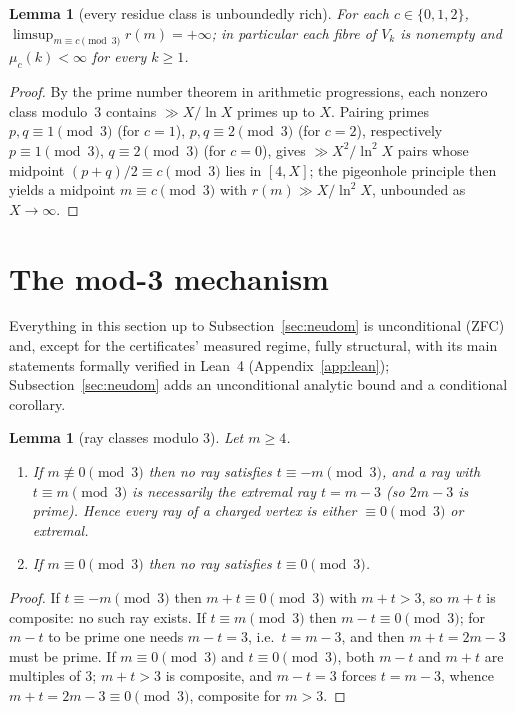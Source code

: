 \documentclass[11pt]{article}
\theoremstyle{plain}
\newtheorem{lemma}[theorem]{Lemma}
\theoremstyle{definition}
\newcommand{\rch}{r}
\newcommand{\Vk}{V_{k}}
\begin{document}
\begin{lemma}[every residue class is unboundedly rich]
\label{lem:fibres}
For each $c \in \{0,1,2\}$,
$\limsup_{m \equiv c \pmod 3} \rch(m) = +\infty$; in particular each
fibre of $\Vk$ is nonempty and $\mu_c(k) < \infty$ for every $k \ge 1$.
\end{lemma}

\begin{proof}
By the prime number theorem in arithmetic progressions, each
nonzero class modulo~$3$ contains $\gg X/\ln X$ primes up to $X$.
Pairing primes $p,q \equiv 1 \pmod 3$ (for $c = 1$),
$p,q \equiv 2 \pmod 3$ (for $c = 2$), respectively
$p \equiv 1 \pmod 3$, $q \equiv 2 \pmod 3$ (for $c = 0$), gives
$\gg X^{2}/\ln^{2} X$ pairs whose midpoint $(p+q)/2 \equiv c \pmod 3$
lies in $[4,X]$; the pigeonhole principle then yields a midpoint
$m \equiv c \pmod 3$ with $\rch(m) \gg X/\ln^{2} X$, unbounded as
$X \to \infty$.
\end{proof}

\section{The mod-3 mechanism}
\label{sec:mod3}

Everything in this section up to Subsection~\ref{sec:neudom} is
unconditional (ZFC) and, except for the certificates' measured
regime, fully structural, with its main statements formally verified
in Lean~4 (Appendix~\ref{app:lean}); Subsection~\ref{sec:neudom}
adds an unconditional analytic bound and a conditional corollary.

\begin{lemma}[ray classes modulo $3$]\label{lem:ray3}
Let $m \ge 4$.
\begin{enumerate}
\item If $m \not\equiv 0 \pmod 3$ then no ray satisfies
      $t \equiv -m \pmod 3$, and a ray with $t \equiv m \pmod 3$ is
      necessarily the extremal ray $t = m - 3$ (so $2m-3$ is prime).
      Hence every ray of a charged vertex is either
      $\equiv 0 \pmod 3$ or extremal.
\item If $m \equiv 0 \pmod 3$ then no ray satisfies
      $t \equiv 0 \pmod 3$.
\end{enumerate}
\end{lemma}

\begin{proof}
If $t \equiv -m \pmod 3$ then $m + t \equiv 0 \pmod 3$ with
$m + t > 3$, so $m + t$ is composite: no such ray exists. If
$t \equiv m \pmod 3$ then $m - t \equiv 0 \pmod 3$; for $m - t$ to be
prime one needs $m - t = 3$, i.e.\ $t = m - 3$, and then
$m + t = 2m - 3$ must be prime. If $m \equiv 0 \pmod 3$ and
$t \equiv 0 \pmod 3$, both $m - t$ and $m + t$ are multiples of $3$;
$m + t > 3$ is composite, and $m - t = 3$ forces $t = m - 3$, whence
$m + t = 2m - 3 \equiv 0 \pmod 3$, composite for $m > 3$.
\end{proof}
\end{document}
